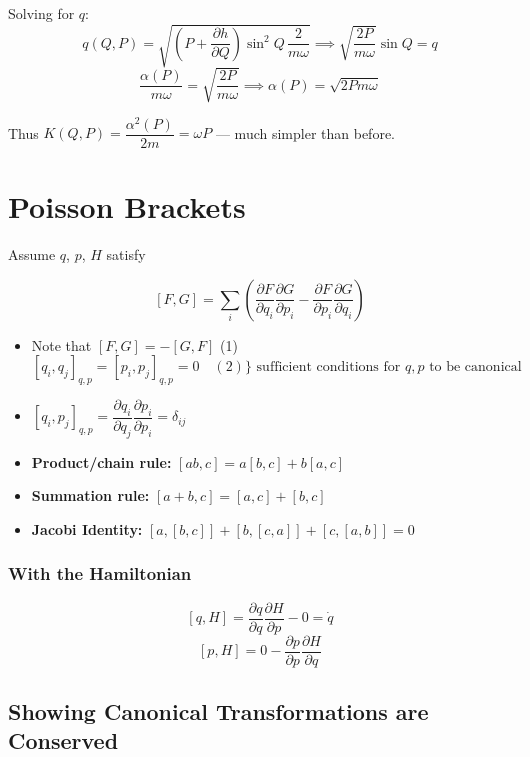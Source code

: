 Solving for $q$:
\[
    q(Q,P) = \sqrt{\left(P + \frac{\partial h}{\partial Q}\right)\sin^2 Q\,\frac{2}{m\omega}} \implies \sqrt{\frac{2P}{m\omega}}\sin Q = q
\]
\[
    \frac{\alpha(P)}{m\omega} = \sqrt{\frac{2P}{m\omega}} \implies \boxed{\alpha(P) = \sqrt{2Pm\omega}}
\]

Thus $K(Q,P) = \dfrac{\alpha^2(P)}{2m} = \omega P$ --- much simpler than before.


\chapter{Poisson Brackets}

Assume $q$, $p$, $H$ satisfy

\begin{definition}
\[
    [F, G] = \sum_i\!\left(\frac{\partial F}{\partial q_i}\frac{\partial G}{\partial p_i} - \frac{\partial F}{\partial p_i}\frac{\partial G}{\partial q_i}\right)
\]
\end{definition}

\begin{itemize}
    \item Note that $[F,G] = -[G,F]$ \quad (1)
    \[
        [q_i, q_j]_{q,p} = [p_i, p_j]_{q,p} = 0 \quad (2) \Bigg\} \text{ sufficient conditions for } q,p \text{ to be canonical}
    \]
    \item $[q_i, p_j]_{q,p} = \dfrac{\partial q_i}{\partial q_j}\dfrac{\partial p_i}{\partial p_i} = \delta_{ij}$
    \item \textbf{Product/chain rule:} $[ab, c] = a[b,c] + b[a,c]$
    \item \textbf{Summation rule:} $[a+b, c] = [a,c] + [b,c]$
    \item \textbf{Jacobi Identity:} $[a,[b,c]] + [b,[c,a]] + [c,[a,b]] = 0$
\end{itemize}

\subsection*{With the Hamiltonian}

\[
    [q, H] = \frac{\partial q}{\partial q}\frac{\partial H}{\partial p} - 0 = \dot{q}
\]
\[
    [p, H] = 0 - \frac{\partial p}{\partial p}\frac{\partial H}{\partial q}
\]

\section{Showing Canonical Transformations are Conserved}


